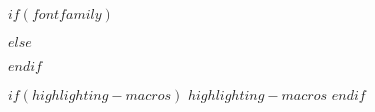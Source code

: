 \usepackage[labelfont=bf,textfont=bf]{caption}

\usepackage{float}

\usepackage{tabularx}

\usepackage[explicit]{titlesec}

\usepackage{titletoc}

\usepackage[$if(fontenc)$$fontenc$$else$T1$endif$]{fontenc}
\usepackage[utf8]{inputenc}
\usepackage{textcomp} %


$if(fontfamily)$
  \usepackage{$fontfamily$}
$else$
  \usepackage{mathptmx}
$endif$

$if(highlighting-macros)$
  $highlighting-macros$
$endif$

\usepackage{longtable,booktabs,array,threeparttable}
\usepackage{multirow}
\usepackage{calc} %

\makeatletter
\patchcmd\longtable{\par}{\if@noskipsec\mbox{}\fi\par}{}{}
\makeatother

\usepackage{framed}
\let\oldquote=\quote
\let\endoldquote=\endquote
{}
\renewenvironment{quote}{\begin{shaded*}\begin{oldquote}}{\end{oldquote}\end{shaded*}}

